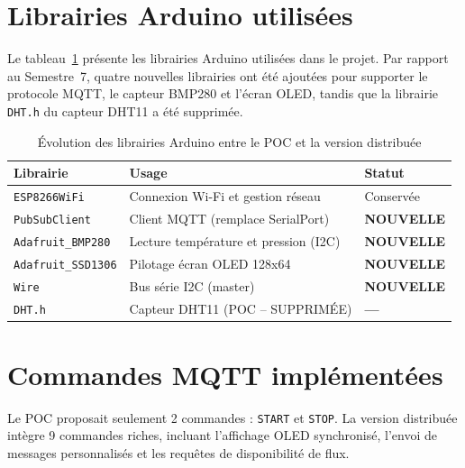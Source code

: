 \documentclass[12pt, a4paper]{report}
\begin{document}
\section{Librairies Arduino utilis\'ees}

Le tableau~\ref{tab:librairies} pr\'esente les librairies Arduino
utilis\'ees dans le projet. Par rapport au Semestre~7, quatre nouvelles
librairies ont \'et\'e ajout\'ees pour supporter le protocole MQTT, le
capteur BMP280 et l'\'ecran OLED, tandis que la librairie
\texttt{DHT.h} du capteur DHT11 a \'et\'e supprim\'ee.

\begin{table}[H]
\centering
\renewcommand{\arraystretch}{1.3}
\begin{tabularx}{\linewidth}{|l|X|l|}
\hline
\rowcolor{bleuFonce!10}
\textbf{Librairie} & \textbf{Usage} & \textbf{Statut} \\
\hline
\texttt{ESP8266WiFi}       & Connexion Wi-Fi et gestion r\'eseau &
  Conserv\'ee \\
\hline
\texttt{PubSubClient}      & Client MQTT (remplace SerialPort) &
  \textcolor{vertOK}{\textbf{NOUVELLE}} \\
\hline
\texttt{Adafruit\_BMP280}  & Lecture temp\'erature et pression (I2C) &
  \textcolor{vertOK}{\textbf{NOUVELLE}} \\
\hline
\texttt{Adafruit\_SSD1306} & Pilotage \'ecran OLED 128x64 &
  \textcolor{vertOK}{\textbf{NOUVELLE}} \\
\hline
\texttt{Wire}              & Bus s\'erie I2C (master) &
  \textcolor{vertOK}{\textbf{NOUVELLE}} \\
\hline
\texttt{DHT.h}             & Capteur DHT11 (POC -- SUPPRIM\'EE) &
  \textcolor{rougeErr}{\textbf{---}} \\
\hline
\end{tabularx}
\caption{\'Evolution des librairies Arduino entre le POC et la version
         distribu\'ee}
\label{tab:librairies}
\end{table}

\section{Commandes MQTT impl\'ement\'ees}

\begin{evolutionbox}
Le POC proposait seulement 2 commandes : \texttt{START} et
\texttt{STOP}. La version distribu\'ee int\`egre 9 commandes riches,
incluant l'affichage OLED synchronis\'e, l'envoi de messages
personnalis\'es et les requ\^etes de disponibilit\'e de flux.
\end{evolutionbox}
\end{document}
